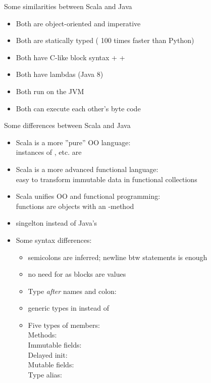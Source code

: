 \documentclass{lecturenotes}
\begin{document}
\begin{Slide}{Some similarities between Scala and Java}
\begin{itemize}
\item Both are object-oriented and imperative
\item Both are statically typed (\code{~} 100 times faster than Python)
\item Both have C-like block syntax \code+{ }+
\item Both have lambdas (Java 8)  
\item Both run on the JVM
\item Both can execute each other's byte code
\end{itemize}
\end{Slide}


\begin{Slide}{Some differences between Scala and Java}\footnotesize
\begin{itemize}
\item Scala is a more ''pure'' OO language: \\ instances of , etc. are  
\item Scala is a more advanced functional language: \\ easy to transform immutable data in functional collections
\item Scala unifies OO and functional programming: \\ functions are objects with an -method
\item singelton  instead of Java's 

\item Some syntax differences: \pause
\begin{itemize}\fontsize{8}{9}\selectfont
\item semicolons are inferred; newline btw statements is enough
\item no need for  as blocks are values
\item Type \emph{after} names and colon: 
\item generic types in \code{[T]} instead of 
\item Five types of members: 
\\ Methods:  
\\ Immutable fields:  
\\  Delayed init:  
\\  Mutable fields:  
\\  Type alias: 
\end{itemize}


\end{itemize}

\end{Slide}
\end{document}
